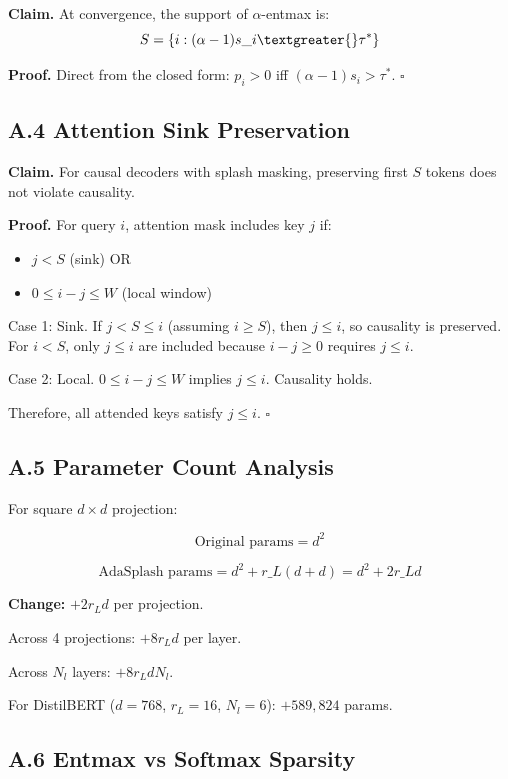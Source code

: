 \textbf{Claim.} At convergence, the support of $\alpha$-entmax is:
\[
S = \{i : (\alpha - 1) s\_i \textgreater{} \tau^*\}
\]

\textbf{Proof.} Direct from the closed form: $p_i > 0$ iff $(\alpha - 1) s_i > \tau^*$. $\square$

\subsection{A.4 Attention Sink Preservation}

\textbf{Claim.} For causal decoders with splash masking, preserving first $S$ 
tokens does not violate causality.

\textbf{Proof.} For query $i$, attention mask includes key $j$ if:
\begin{itemize}
\item $j < S$ (sink) OR
\item $0 \leq i - j \leq W$ (local window)

\end{itemize}
Case 1: Sink. If $j < S \leq i$ (assuming $i \geq S$), then $j \leq i$, 
so causality is preserved. For $i < S$, only $j \leq i$ are included 
because $i - j \geq 0$ requires $j \leq i$.

Case 2: Local. $0 \leq i - j \leq W$ implies $j \leq i$. Causality holds.

Therefore, all attended keys satisfy $j \leq i$. $\square$

\subsection{A.5 Parameter Count Analysis}

For square $d \times d$ projection:

\[
\text{Original params} = d^2
\tag{A.6}
\]

\[
\text{AdaSplash params} = d^2 + r\_L (d + d) = d^2 + 2 r\_L d
\tag{A.7}
\]

\textbf{Change:} $+2 r_L d$ per projection.

Across 4 projections: $+8 r_L d$ per layer.

Across $N_l$ layers: $+8 r_L d N_l$.

For DistilBERT ($d = 768$, $r_L = 16$, $N_l = 6$): $+589{,}824$ params.

\subsection{A.6 Entmax vs Softmax Sparsity}

